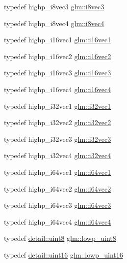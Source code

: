 \begin{DoxyCompactItemize}
\item 
typedef highp\+\_\+i8vec3 \hyperlink{group__gtc__type__precision_ga97a6cae79db311cdd47c4e88a5855987}{glm\+::i8vec3}
\item 
typedef highp\+\_\+i8vec4 \hyperlink{group__gtc__type__precision_gafbf10a778016eba57d44beb585f2dc49}{glm\+::i8vec4}
\item 
typedef highp\+\_\+i16vec1 \hyperlink{group__gtc__type__precision_gacec84a02174e44363dd105769fb22473}{glm\+::i16vec1}
\item 
typedef highp\+\_\+i16vec2 \hyperlink{group__gtc__type__precision_ga37af364ff13fb791571dd324dfd3ca89}{glm\+::i16vec2}
\item 
typedef highp\+\_\+i16vec3 \hyperlink{group__gtc__type__precision_ga85e903f028d903b416a1119b00af57ea}{glm\+::i16vec3}
\item 
typedef highp\+\_\+i16vec4 \hyperlink{group__gtc__type__precision_gaf074450c0e60b45114084b1df4012a1d}{glm\+::i16vec4}
\item 
typedef highp\+\_\+i32vec1 \hyperlink{group__gtc__type__precision_ga05a766bbe2ad0791ed0081baac492da7}{glm\+::i32vec1}
\item 
typedef highp\+\_\+i32vec2 \hyperlink{group__gtc__type__precision_ga25820e641988fe33b075d80434872d02}{glm\+::i32vec2}
\item 
typedef highp\+\_\+i32vec3 \hyperlink{group__gtc__type__precision_gab67e08f6a4b1bce82a9a34ecb2bfba64}{glm\+::i32vec3}
\item 
typedef highp\+\_\+i32vec4 \hyperlink{group__gtc__type__precision_ga3ada3676600db65a425058c0a150d83e}{glm\+::i32vec4}
\item 
typedef highp\+\_\+i64vec1 \hyperlink{group__gtc__type__precision_ga7ee2c91a98ebd719ae26e15ad89106de}{glm\+::i64vec1}
\item 
typedef highp\+\_\+i64vec2 \hyperlink{group__gtc__type__precision_ga5a03cb457be28a9a8b9e61163fe648a1}{glm\+::i64vec2}
\item 
typedef highp\+\_\+i64vec3 \hyperlink{group__gtc__type__precision_ga189eb8d6a197bc491cabb6e1f120ecf4}{glm\+::i64vec3}
\item 
typedef highp\+\_\+i64vec4 \hyperlink{group__gtc__type__precision_gade5e969a6155752095d2cd603bda9408}{glm\+::i64vec4}
\item 
typedef \hyperlink{stb__image_8c_adde6aaee8457bee49c2a92621fe22b79}{detail\+::uint8} \hyperlink{group__gtc__type__precision_ga4d9dc08b7b248a386dfe9afd00fc6b1e}{glm\+::lowp\+\_\+uint8}
\item 
typedef \hyperlink{stb__image_8c_a05f6b0ae8f6a6e135b0e290c25fe0e4e}{detail\+::uint16} \hyperlink{group__gtc__type__precision_ga9b8409887319f62f06e664f6ca121b9d}{glm\+::lowp\+\_\+uint16}

\end{DoxyCompactItemize}
